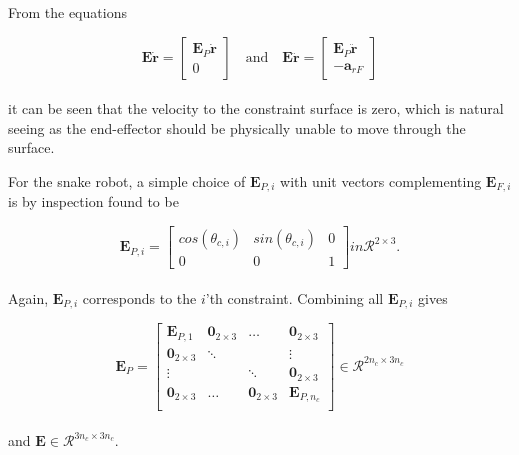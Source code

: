 From the equations

\begin{equation}
    \mathbf{E\dot{r}} =
    \begin{bmatrix}
        \mathbf{E}_P \mathbf{\dot{r}}\\
        0
    \end{bmatrix}
    \quad \text{and} \quad
    \mathbf{E\ddot{r}} =
    \begin{bmatrix}
        \mathbf{E}_P \mathbf{\ddot{r}} \\
        -\mathbf{a}_{r F}
    \end{bmatrix}
\end{equation}
\\
it can be seen that the velocity to the constraint surface is zero, which is natural seeing as the end-effector should be physically unable to move through the surface.

For the snake robot, a simple choice of $\mathbf{E}_{P,i}$ with unit vectors complementing $\mathbf{E}_{F,i}$ is by inspection found to be

\begin{equation}\label{eq:dhpfc_EPi}
    \mathbf{E}_{P,i} = 
    \begin{bmatrix}
        cos(\theta_{c,i}) & sin(\theta_{c,i}) & 0 \\
        0 & 0 & 1
    \end{bmatrix} in \mathcal{R}^{2\times 3}.
\end{equation}
\\
Again, $\mathbf{E}_{P,i}$ corresponds to the $i$'th constraint. Combining all $\mathbf{E}_{P,i}$ gives 

\begin{equation}
    \mathbf{E}_P = 
    \begin{bmatrix}
        \mathbf{E}_{P,1} & \mathbf{0}_{2\times3} & \dots & \mathbf{0}_{2\times3} \\
        \mathbf{0}_{2\times3} & \ddots & & \vdots \\
        \vdots & & \ddots & \mathbf{0}_{2\times3} \\
        \mathbf{0}_{2\times3} & \dots & \mathbf{0}_{2\times3} & \mathbf{E}_{P,n_c} \\
    \end{bmatrix} \in \mathcal{R}^{2 n_c \times 3 n_c}
\end{equation}
\\
and $\mathbf{E} \in \mathcal{R}^{3 n_c \times 3 n_c}$.


